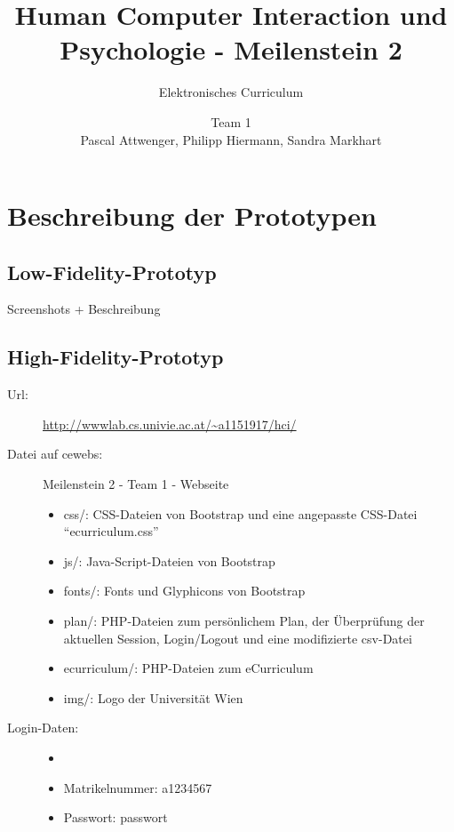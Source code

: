 \documentclass[a4paper,10pt]{scrartcl}
\title{Human Computer Interaction und Psychologie - Meilenstein 2}
\subtitle{Elektronisches Curriculum}
\author{Team 1 \\Pascal Attwenger, Philipp Hiermann, Sandra Markhart}
\begin{document}
\maketitle

\section*{Beschreibung der Prototypen}

\subsection*{Low-Fidelity-Prototyp}

Screenshots + Beschreibung

\subsection*{High-Fidelity-Prototyp}

\begin{description}
 \item[Url:] \url{http://wwwlab.cs.univie.ac.at/~a1151917/hci/}
 \item[Datei auf cewebs:]Meilenstein 2 - Team 1 - Webseite
  \begin{itemize}
  \item css/: CSS-Dateien von Bootstrap und eine angepasste CSS-Datei ``ecurriculum.css''
  \item js/: Java-Script-Dateien von Bootstrap
  \item fonts/: Fonts und Glyphicons von Bootstrap
  \item plan/: PHP-Dateien zum persönlichem Plan, der Überprüfung der aktuellen Session, Login/Logout und eine modifizierte csv-Datei
  \item ecurriculum/: PHP-Dateien zum eCurriculum
  \item img/: Logo der Universität Wien
 \end{itemize}
\end{description}

\begin{description}
 \item[Login-Daten:] 
 \begin{itemize}
  \item[]
  \item Matrikelnummer: a1234567
  \item Passwort: passwort
 \end{itemize}

\end{description}
\end{document}
